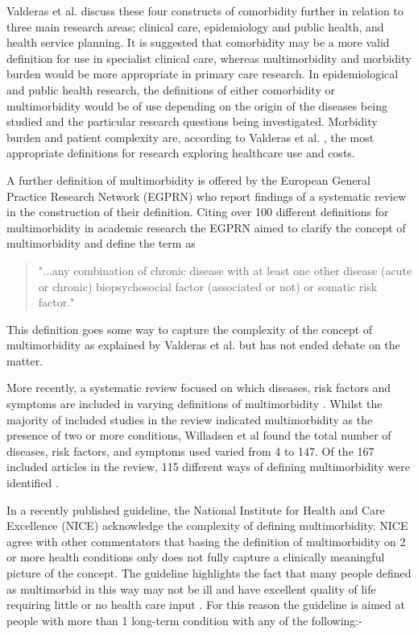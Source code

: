 \documentclass[12pt,]{report}
\begin{document}
Valderas et al. \citep{RN64} discuss these four constructs of
comorbidity further in relation to three main research areas; clinical
care, epidemiology and public health, and health service planning. It is
suggested that comorbidity may be a more valid definition for use in
specialist clinical care, whereas multimorbidity and morbidity burden
would be more appropriate in primary care research. In epidemiological
and public health research, the definitions of either comorbidity or
multimorbidity would be of use depending on the origin of the diseases
being studied and the particular research questions being investigated.
Morbidity burden and patient complexity are, according to Valderas et
al. \citep{RN64}, the most appropriate definitions for research
exploring healthcare use and costs.

A further definition of multimorbidity is offered by the European
General Practice Research Network (EGPRN) who report findings of a
systematic review in the construction of their definition. Citing over
100 different definitions for multimorbidity in academic research the
EGPRN \citep[pp.1]{RN77} aimed to clarify the concept of multimorbidity
and define the term as

\begin{quotation} "...any combination of chronic disease with at least one other disease (acute or chronic) biopsychosocial factor (associated or not) or somatic risk factor." \end{quotation}

This definition goes some way to capture the complexity of the concept
of multimorbidity as explained by Valderas et al. \citeyearpar{RN64} but
has not ended debate on the matter.

More recently, a systematic review focused on which diseases, risk
factors and symptoms are included in varying definitions of
multimorbidity \citep{RN254}. Whilst the majority of included studies in
the review indicated multimorbidity as the presence of two or more
conditions, Willadsen et al \citeyearpar{RN254} found the total number
of diseases, risk factors, and symptoms used varied from 4 to 147. Of
the 167 included articles in the review, 115 different ways of defining
multimorbidity were identified \citep{RN254}.

In a recently published guideline, the National Institute for Health and
Care Excellence (NICE) \citep{RN226} acknowledge the complexity of
defining multimorbidity. NICE agree with other commentators \citep{RN21}
that basing the definition of multimorbidity on 2 or more health
conditions only does not fully capture a clinically meaningful picture
of the concept. The guideline highlights the fact that many people
defined as multimorbid in this way may not be ill and have excellent
quality of life requiring little or no health care input \citep{RN226}.
For this reason the guideline is aimed at people with more than 1
long-term condition with any of the following:-
\end{document}
